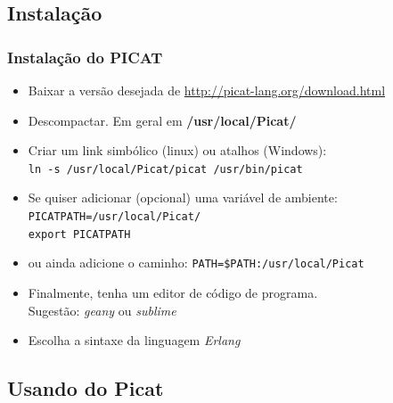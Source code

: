 \subsection{Instalação}
\begin{frame}
    \frametitle{Instalação do PICAT}

  \begin{itemize}
    \item Baixar a versão desejada de \url{http://picat-lang.org/download.html}
   \item Descompactar. Em geral em \textbf{/usr/local/Picat/}
    \item Criar um link simbólico (linux) ou atalhos (Windows):\\ 
   \texttt{ln -s /usr/local/Picat/picat   \hspace{1cm}   /usr/bin/picat}
    \item Se quiser adicionar (opcional) uma variável de ambiente:\\
          \texttt{PICATPATH=/usr/local/Picat/}\\
          \texttt{export PICATPATH}

    \item ou ainda adicione o caminho: \texttt{PATH=\$PATH:/usr/local/Picat}

   \item Finalmente, tenha um editor de código de programa.\\
     Sugestão: \textit{geany} ou \textit{sublime}
     
    \item Escolha a sintaxe da linguagem \textit{Erlang} 
    
  \end{itemize}



\end{frame}



\subsection{Usando do Picat}


